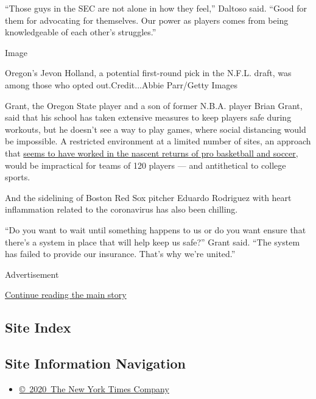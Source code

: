 ``Those guys in the SEC are not alone in how they feel,'' Daltoso said.
``Good for them for advocating for themselves. Our power as players
comes from being knowledgeable of each other's struggles.''

Image

Oregon's Jevon Holland, a potential first-round pick in the N.F.L.
draft, was among those who opted out.Credit...Abbie Parr/Getty Images

Grant, the Oregon State player and a son of former N.B.A. player Brian
Grant, said that his school has taken extensive measures to keep players
safe during workouts, but he doesn't see a way to play games, where
social distancing would be impossible. A restricted environment at a
limited number of sites, an approach that
\href{https://www.nytimes3xbfgragh.onion/2020/07/30/sports/basketball/sports-bubble-nba-mlb.html}{seems
to have worked in the nascent returns of pro basketball and soccer},
would be impractical for teams of 120 players --- and antithetical to
college sports.

And the sidelining of Boston Red Sox pitcher Eduardo Rodriguez with
heart inflammation related to the coronavirus has also been chilling.

``Do you want to wait until something happens to us or do you want
ensure that there's a system in place that will help keep us safe?''
Grant said. ``The system has failed to provide our insurance. That's why
we're united.''

Advertisement

\protect\hyperlink{after-bottom}{Continue reading the main story}

\hypertarget{site-index}{%
\subsection{Site Index}\label{site-index}}

\hypertarget{site-information-navigation}{%
\subsection{Site Information
Navigation}\label{site-information-navigation}}

\begin{itemize}
\tightlist
\item
  \href{https://help.nytimes3xbfgragh.onion/hc/en-us/articles/115014792127-Copyright-notice}{©~2020~The
  New York Times Company}
\end{itemize}


